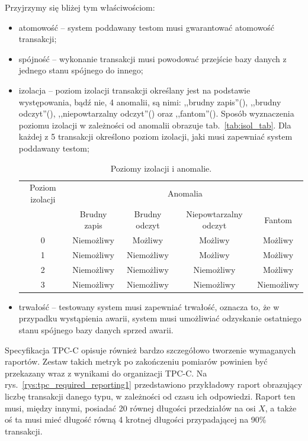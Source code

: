 Przyjrzymy się bliżej tym właściwościom:
\begin{itemize}
\item atomowość -- system poddawany testom musi gwarantować atomowość transakcji;
\item spójność -- wykonanie transakcji musi powodować przejście bazy danych z jednego stanu spójnego do innego;
\item izolacja -- poziom izolacji transakcji określany jest na podstawie występowania, bądź nie, 4 anomalii,
są nimi: ,,brudny zapis''(), ,,brudny odczyt''(), 
,,niepowtarzalny odczyt''() oraz ,,fantom''(). 
Sposób wyznaczenia poziomu izolacji w zależności od anomalii obrazuje tab.~\vref{tab:isol_tab}.
Dla każdej z 5 transakcji określono poziom izolacji, jaki musi zapewniać system poddawany testom;

\begin{table}[t]
\caption{Poziomy izolacji i anomalie.}\label{tab:isol_tab}
\scriptsize\centering%
\begin{tabular}{c c c c c}
\toprule
Poziom izolacji & \multicolumn{4}{c}{Anomalia} \\ \cmidrule{2-5}
                & Brudny zapis & Brudny odczyt & Niepowtarzalny odczyt & Fantom \\ \midrule
0 & Niemożliwy & Możliwy    & Możliwy   & Możliwy    \\
1 & Niemożliwy & Niemożliwy & Możliwy   & Możliwy    \\
2 & Niemożliwy & Niemożliwy & Niemożliwy& Możliwy    \\
3 & Niemożliwy & Niemożliwy & Niemożliwy& Niemożliwy \\
\bottomrule
\end{tabular}
\end{table}

\item trwałość -- testowany system musi zapewniać trwałość, oznacza to, że w przypadku wystąpienia
awarii, system musi umożliwiać odzyskanie ostatniego stanu spójnego bazy danych sprzed awarii.
\end{itemize}

Specyfikacja TPC-C opisuje również bardzo szczegółowo tworzenie wymaganych raportów.
Zestaw takich metryk po zakończeniu pomiarów powinien być przekazany wraz z wynikami do organizacji TPC-C.
Na rys.~\vref{rys:tpc_required_reporting1} przedstawiono przykładowy raport obrazujący
liczbę transakcji danego typu, w zależności od czasu ich odpowiedzi. Raport ten musi, między innymi, posiadać 
20 równej długości przedziałów na osi $X$, a także oś ta musi mieć długość równą 
4 krotnej długości przypadającej na 90\% transakcji. 

